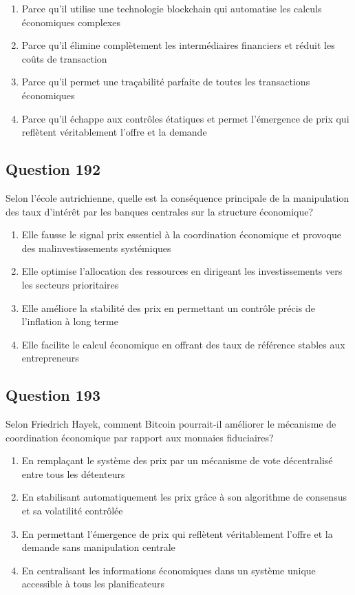 \documentclass[12pt,a4paper]{article}
\begin{document}
\begin{enumerate}[label=\Alph*., leftmargin=*]
\item Parce qu'il utilise une technologie blockchain qui automatise les calculs économiques complexes
\item Parce qu'il élimine complètement les intermédiaires financiers et réduit les coûts de transaction
\item Parce qu'il permet une traçabilité parfaite de toutes les transactions économiques
\item Parce qu'il échappe aux contrôles étatiques et permet l'émergence de prix qui reflètent véritablement l'offre et la demande
\end{enumerate}

\bigskip


\subsection*{Question 192}
Selon l'école autrichienne, quelle est la conséquence principale de la manipulation des taux d'intérêt par les banques centrales sur la structure économique?

\begin{enumerate}[label=\Alph*., leftmargin=*]
\item Elle fausse le signal prix essentiel à la coordination économique et provoque des malinvestissements systémiques
\item Elle optimise l'allocation des ressources en dirigeant les investissements vers les secteurs prioritaires
\item Elle améliore la stabilité des prix en permettant un contrôle précis de l'inflation à long terme
\item Elle facilite le calcul économique en offrant des taux de référence stables aux entrepreneurs
\end{enumerate}

\bigskip


\subsection*{Question 193}
Selon Friedrich Hayek, comment Bitcoin pourrait-il améliorer le mécanisme de coordination économique par rapport aux monnaies fiduciaires?

\begin{enumerate}[label=\Alph*., leftmargin=*]
\item En remplaçant le système des prix par un mécanisme de vote décentralisé entre tous les détenteurs
\item En stabilisant automatiquement les prix grâce à son algorithme de consensus et sa volatilité contrôlée
\item En permettant l'émergence de prix qui reflètent véritablement l'offre et la demande sans manipulation centrale
\item En centralisant les informations économiques dans un système unique accessible à tous les planificateurs
\end{enumerate}
\end{document}
